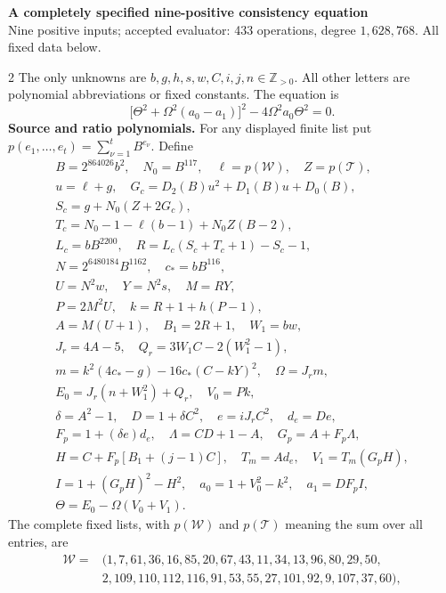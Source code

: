 \documentclass[10pt]{article}
\let\bigsum\sum
\renewcommand{\sum}{\bigsum\nolimits}
\begin{document}
\noindent\parbox{\textwidth}{\centering
{\large\bfseries A completely specified nine-positive consistency equation}\\[-1pt]
{\small Nine positive inputs; accepted evaluator: 433 operations, degree $1{,}628{,}768$. All fixed data below.}}\par
\begin{multicols}{2}
\fontsize{9}{9.0}\selectfont
The only unknowns are $b,g,h,s,w,C,i,j,n\in\mathbb Z_{>0}$.
All other letters are polynomial abbreviations or fixed constants.
The equation is
\[
\boxed{\bigl[\Theta^2+\Omega^2(a_0-a_1)\bigr]^2
       -4\Omega^2a_0\Theta^2=0.}
\]
\textbf{Source and ratio polynomials.} For any displayed finite list put
$p(e_1,\ldots,e_t)=\sum_{\nu=1}^{t}B^{e_\nu}$. Define
\[
\begin{gathered}
B=2^{864026}b^2,\quad N_0=B^{117},\quad\ell=p(\mathcal W),\quad Z=p(\mathcal T),\\
u=\ell+g,\quad G_c=D_2(B)u^2+D_1(B)u+D_0(B),\\
S_c=g+N_0(Z+2G_c),\\
T_c=N_0-1-\ell(b-1)+N_0Z(B-2),\\
L_c=bB^{2200},\quad R=L_c(S_c+T_c+1)-S_c-1,\\
N=2^{6480184}B^{1162},\quad c_*=bB^{116},\\
U=N^2w,\quad Y=N^2s,\quad M=RY,\\
P=2M^2U,\quad k=R+1+h(P-1),\\
A=M(U+1),\quad B_1=2R+1,\quad W_1=bw,\\
J_r=4A-5,\quad Q_r=3W_1C-2(W_1^2-1),\\
m=k^2(4c_*-g)-16c_*(C-kY)^2,\quad\Omega=J_rm,\\
E_0=J_r(n+W_1^2)+Q_r,\quad V_0=Pk,\\
\delta=A^2-1,\quad D=1+\delta C^2,\quad e=iJ_rC^2,\quad d_e=De,\\
F_p=1+(\delta e)d_e,\quad\Lambda=CD+1-A,\quad G_p=A+F_p\Lambda,\\
H=C+F_p[B_1+(j-1)C],\quad T_m=Ad_e,\quad V_1=T_m(G_pH),\\
I=1+(G_pH)^2-H^2,\quad a_0=1+V_0^2-k^2,\quad a_1=DF_pI,\\
\Theta=E_0-\Omega(V_0+V_1).
\end{gathered}
\]
The complete fixed lists, with $p(\mathcal W)$ and $p(\mathcal T)$ meaning
the sum over all entries, are
\[
\begin{aligned}
\mathcal W={}&(1,7,61,36,16,85,20,67,43,11,34,13,96,80,29,50,\\
 &2,109,110,112,116,91,53,55,27,101,92,9,107,37,60),\\

\end{aligned}\]
\end{multicols}
\end{document}
